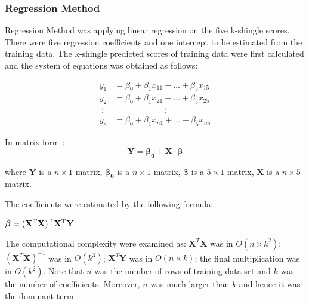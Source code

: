 \subsubsection{Regression Method}
Regression Method was applying linear regression on the five k-shingle scores. 
There were five regression coefficients and one intercept to be estimated from the training data. The k-shingle predicted scores of training data were first calculated and the system of equations was obtained as follows:

\begin{displaymath}
\begin{alignedat}{4}
y_1 &= \beta_0  + \beta_1 x_{11} + \dots + \beta_5 x_{15}\\
y_2 &= \beta_0 + \beta_1 x_{21} + \dots + \beta_5 x_{25}\\
\;\vdots  &            \qquad\qquad\qquad\vdots \\
y_n &= \beta_0 + \beta_1 x_{n1} + \dots + \beta_5 x_{n5}
\end{alignedat}
\end{displaymath}

In matrix form :
\begin{displaymath}
\textbf{Y}= \boldsymbol{\beta_0}+\textbf{X} \cdot \boldsymbol{\beta}
\end{displaymath}

\raggedright
where \(\textbf{Y}\) is a \(n\times1\) matrix, \(\boldsymbol{\beta_0}\) is a \(n\times 1\) matrix, \(\boldsymbol{\beta}\) is a \(5\times 1\) matrix, \(\textbf{X}\) is a \(n\times 5\) matrix.


The coefficients were estimated by the following formula: \\

\begin{center}
\(\hat{\boldsymbol{\beta}} = (\textbf{X} \textsuperscript{T} \textbf{X} ) \textsuperscript{-1} \textbf{X} \textsuperscript{T} \textbf{Y}  \) \\
\end{center}

The computational complexity were examined as: \(\textbf{X}^{T}\textbf{X}\) was in \(O(n \times k^2)\); \((\textbf{X}^{T}\textbf{X})^{-1}\) was in \(O(k^3)\);
\(\textbf{X}^T\textbf{Y}\) was in \(O(n\times k)\); the final multiplication was in \(O(k^2)\).
Note that \(n\) was the number of rows of training data set and \(k\) was the number of coefficients. Moreover, \(n\) was much larger than \(k\) and hence it was the dominant term.

